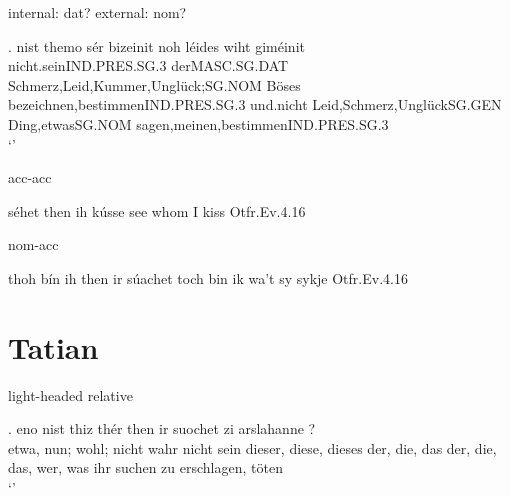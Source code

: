 
internal: dat? external: nom?

\exg. nist	themo	sér	bizeinit	noh	léides	wiht	giméinit\\
nicht.seinIND.PRES.SG.3	derMASC.SG.DAT	Schmerz,Leid,Kummer,Unglück;SG.NOM Böses	bezeichnen,bestimmenIND.PRES.SG.3 und.nicht Leid,Schmerz,UnglückSG.GEN	Ding,etwasSG.NOM	sagen,meinen,bestimmenIND.PRES.SG.3\\
  `' 



acc-acc

séhet	then	ih	kússe
see whom I kiss
Otfr.Ev.4.16


nom-acc

thoh	bín	ih	then	ir	súachet
toch bin ik wa't sy sykje
Otfr.Ev.4.16





\phantom{x}



\section{Tatian}

light-headed relative

\exg. eno	nist	thiz	thér	then	ir	suochet	zi	arslahanne	?\\
 etwa, nun; wohl; nicht wahr	nicht	sein	dieser, diese, dieses	der, die, das	der, die, das, wer, was	ihr	suchen	zu	erschlagen, töten\\
 `'

\phantom{x}
